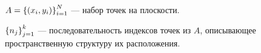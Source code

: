






 $A = \left\{\left(x_i, y_i\right)\right\}_{i=1}^N$ --- набор точек на плоскости.

 $\left\{n_j\right\}_{j=1}^k$ --- последовательность индексов точек из $A$, описывающее пространственную структуру их расположения.



